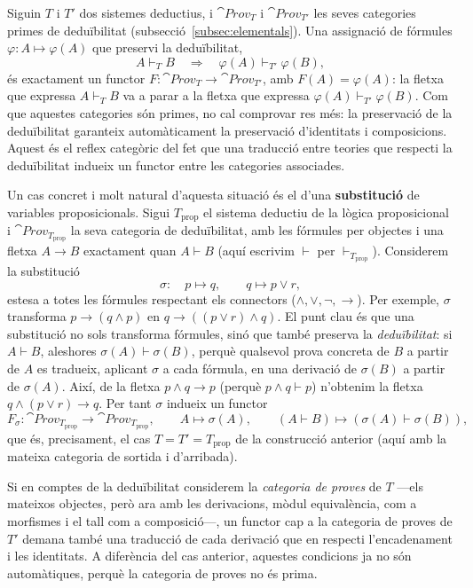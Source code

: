 \begin{exemple}\label{ex:deduibilitat-functors}
Siguin $T$ i $T'$ dos sistemes deductius, i $\cat{Prov}_T$ i $\cat{Prov}_{T'}$ les seves categories primes de deduïbilitat (subsecció~\ref{subsec:elementals}). Una assignació de fórmules $\varphi\colon A\mapsto \varphi(A)$ que preservi la deduïbilitat,
\[
A\vdash_T B
\quad\Longrightarrow\quad
\varphi(A)\vdash_{T'}\varphi(B),
\]
és exactament un functor $F\colon\cat{Prov}_T\to\cat{Prov}_{T'}$, amb $F(A)=\varphi(A)$: la fletxa que expressa $A\vdash_T B$ va a parar a la fletxa que expressa $\varphi(A)\vdash_{T'}\varphi(B)$. Com que aquestes categories són primes, no cal comprovar res més: la preservació de la deduïbilitat garanteix automàticament la preservació d'identitats i composicions. Aquest és el reflex categòric del fet que una traducció entre teories que respecti la deduïbilitat indueix un functor entre les categories associades.

Un cas concret i molt natural d'aquesta situació és el d'una \textbf{substitució} de variables proposicionals. Sigui $T_{\mathrm{prop}}$ el sistema deductiu de la lògica proposicional i $\cat{Prov}_{T_{\mathrm{prop}}}$ la seva categoria de deduïbilitat, amb les fórmules per objectes i una fletxa $A\to B$ exactament quan $A\vdash B$ (aquí escrivim $\vdash$ per $\vdash_{T_{\mathrm{prop}}}$). Considerem la substitució
\[
\sigma\colon\quad p\mapsto q,\qquad q\mapsto p\lor r,
\]
estesa a totes les fórmules respectant els connectors ($\land,\lor,\neg,\to$). Per exemple, $\sigma$ transforma $p\to(q\land p)$ en $q\to((p\lor r)\land q)$. El punt clau és que una substitució no sols transforma fórmules, sinó que també preserva la \emph{deduïbilitat}: si $A\vdash B$, aleshores $\sigma(A)\vdash\sigma(B)$, perquè qualsevol prova concreta de $B$ a partir de $A$ es tradueix, aplicant $\sigma$ a cada fórmula, en una derivació de $\sigma(B)$ a partir de $\sigma(A)$. Així, de la fletxa $p\land q\to p$ (perquè $p\land q\vdash p$) n'obtenim la fletxa $q\land(p\lor r)\to q$. Per tant $\sigma$ indueix un functor
\[
F_\sigma\colon\cat{Prov}_{T_{\mathrm{prop}}}\longrightarrow\cat{Prov}_{T_{\mathrm{prop}}},
\qquad
A\mapsto\sigma(A),
\qquad
(A\vdash B)\mapsto(\sigma(A)\vdash\sigma(B)),
\]
que és, precisament, el cas $T=T'=T_{\mathrm{prop}}$ de la construcció anterior (aquí amb la mateixa categoria de sortida i d'arribada).
\end{exemple}

\begin{observacio}
Si en comptes de la deduïbilitat considerem la \emph{categoria de proves} de $T$ ---els mateixos objectes, però ara amb les derivacions, mòdul equivalència, com a morfismes i el tall com a composició---, un functor cap a la categoria de proves de $T'$ demana també una traducció de cada derivació que en respecti l'encadenament i les identitats. A diferència del cas anterior, aquestes condicions ja no són automàtiques, perquè la categoria de proves no és prima.
\end{observacio}


